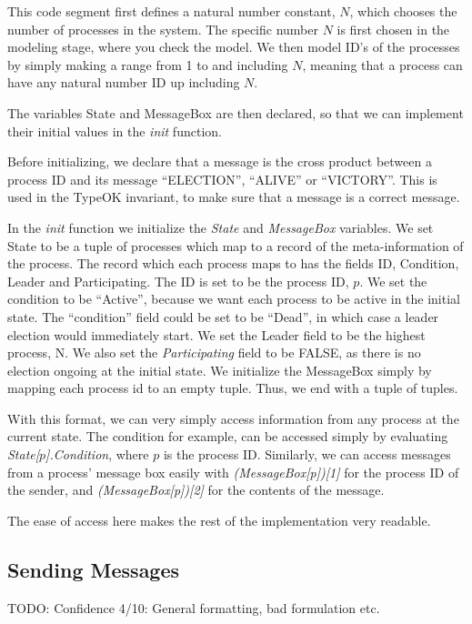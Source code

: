 \documentclass{article}
\begin{document}
This code segment first defines a natural number constant, $N$, which chooses the number of processes in the system. The specific number $N$ is first chosen in the modeling stage, where you check the model. We then model ID's of the processes by simply making a range from 1 to and including $N$, meaning that a process can have any natural number ID up including $N$.

The variables State and MessageBox are then declared, so that we can implement their initial values in the \textit{init} function.

Before initializing, we declare that a message is the cross product between a process ID and its message ``ELECTION'', ``ALIVE'' or ``VICTORY''. This is used in the TypeOK invariant, to make sure that a message is a correct message.

In the \textit{init} function we initialize the \textit{State} and \textit{MessageBox} variables. We set State to be a tuple of processes which map to a record of the meta-information of the process. The record which each process maps to has the fields ID, Condition, Leader and Participating. The ID is set to be the process ID, $p$. We set the condition to be ``Active'', because we want each process to be active in the initial state. The ``condition'' field could be set to be ``Dead'', in which case a leader election would immediately start. We set the Leader field to be the highest process, N. We also set the \textit{Participating} field to be FALSE, as there is no election ongoing at the initial state.
We initialize the MessageBox simply by mapping each process id to an empty tuple. Thus, we end with a tuple of tuples.

With this format, we can very simply access information from any process at the current state. The condition for example, can be accessed simply by evaluating {\textit{State[$p$].Condition}}, where $p$ is the process ID. Similarly, we can access messages from a process' message box easily with \textit{(MessageBox[p])[1]} for the process ID of the sender, and \textit{(MessageBox[p])[2]} for the contents of the message.

The ease of access here makes the rest of the implementation very readable.

\subsection{Sending Messages}

TODO: Confidence 4/10: General formatting, bad formulation etc.
\end{document}

